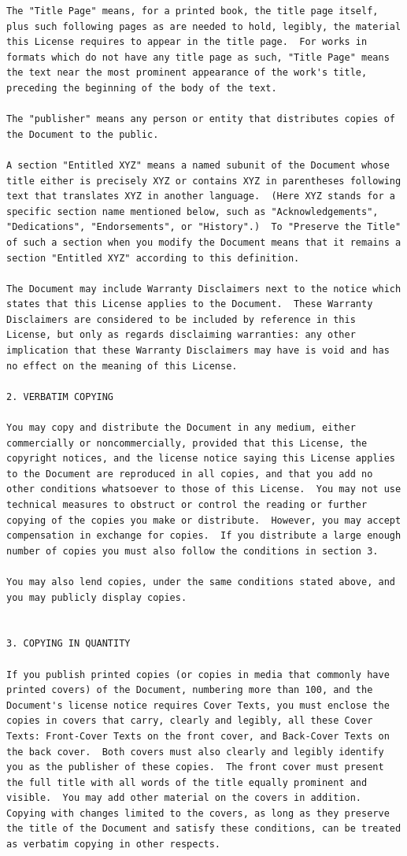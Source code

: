 \documentclass[a4paper]{report}
\begin{document}
\begin{verbatim}
The "Title Page" means, for a printed book, the title page itself,
plus such following pages as are needed to hold, legibly, the material
this License requires to appear in the title page.  For works in
formats which do not have any title page as such, "Title Page" means
the text near the most prominent appearance of the work's title,
preceding the beginning of the body of the text.

The "publisher" means any person or entity that distributes copies of
the Document to the public.

A section "Entitled XYZ" means a named subunit of the Document whose
title either is precisely XYZ or contains XYZ in parentheses following
text that translates XYZ in another language.  (Here XYZ stands for a
specific section name mentioned below, such as "Acknowledgements",
"Dedications", "Endorsements", or "History".)  To "Preserve the Title"
of such a section when you modify the Document means that it remains a
section "Entitled XYZ" according to this definition.

The Document may include Warranty Disclaimers next to the notice which
states that this License applies to the Document.  These Warranty
Disclaimers are considered to be included by reference in this
License, but only as regards disclaiming warranties: any other
implication that these Warranty Disclaimers may have is void and has
no effect on the meaning of this License.

2. VERBATIM COPYING

You may copy and distribute the Document in any medium, either
commercially or noncommercially, provided that this License, the
copyright notices, and the license notice saying this License applies
to the Document are reproduced in all copies, and that you add no
other conditions whatsoever to those of this License.  You may not use
technical measures to obstruct or control the reading or further
copying of the copies you make or distribute.  However, you may accept
compensation in exchange for copies.  If you distribute a large enough
number of copies you must also follow the conditions in section 3.

You may also lend copies, under the same conditions stated above, and
you may publicly display copies.


3. COPYING IN QUANTITY

If you publish printed copies (or copies in media that commonly have
printed covers) of the Document, numbering more than 100, and the
Document's license notice requires Cover Texts, you must enclose the
copies in covers that carry, clearly and legibly, all these Cover
Texts: Front-Cover Texts on the front cover, and Back-Cover Texts on
the back cover.  Both covers must also clearly and legibly identify
you as the publisher of these copies.  The front cover must present
the full title with all words of the title equally prominent and
visible.  You may add other material on the covers in addition.
Copying with changes limited to the covers, as long as they preserve
the title of the Document and satisfy these conditions, can be treated
as verbatim copying in other respects.


\end{verbatim}
\end{document}
